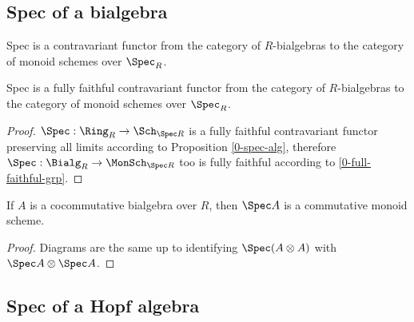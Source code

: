 \subsection{Spec of a bialgebra}


\begin{definition}
  \label{0-spec-bialg}
  \leanok

  Spec is a contravariant functor from the category of $R$-bialgebras
  to the category of monoid schemes over $\Spec_R$.
\end{definition}


\begin{proposition}
  \label{0-full-faithful-spec-bialg}
  \leanok

  Spec is a fully faithful contravariant functor from the category of $R$-bialgebras
  to the category of monoid schemes over $\Spec_R$.
\end{proposition}
\begin{proof}
  \leanok

  $\Spec : \Ring_R \to \Sch_{\Spec R}$ is a fully faithful contravariant functor
  preserving all limits according to Proposition \ref{0-spec-alg},
  therefore $\Spec : \Bialg_R \to \MonSch_{\Spec R}$ too is fully faithful
  according to \ref{0-full-faithful-grp}.
\end{proof}


\begin{proposition}
  \label{0-spec-cocomm-bialg}
  \leanok

  If $A$ is a cocommutative bialgebra over $R$, then $\Spec A$ is a commutative monoid scheme.
\end{proposition}
\begin{proof}
  \leanok

  Diagrams are the same up to identifying $\Spec (A \otimes A)$ with $\Spec A \otimes \Spec A$.
\end{proof}


\subsection{Spec of a Hopf algebra}



